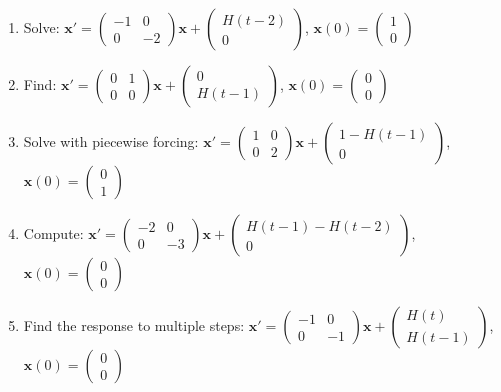 \documentclass[12pt]{article}
\begin{document}
\begin{enumerate}[start=6]
\item Solve: $\mathbf{x}' = \begin{pmatrix} -1 & 0 \\ 0 & -2 \end{pmatrix}\mathbf{x} + \begin{pmatrix} H(t-2) \\ 0 \end{pmatrix}$, $\mathbf{x}(0) = \begin{pmatrix} 1 \\ 0 \end{pmatrix}$

\item Find: $\mathbf{x}' = \begin{pmatrix} 0 & 1 \\ 0 & 0 \end{pmatrix}\mathbf{x} + \begin{pmatrix} 0 \\ H(t-1) \end{pmatrix}$, $\mathbf{x}(0) = \begin{pmatrix} 0 \\ 0 \end{pmatrix}$

\item Solve with piecewise forcing: $\mathbf{x}' = \begin{pmatrix} 1 & 0 \\ 0 & 2 \end{pmatrix}\mathbf{x} + \begin{pmatrix} 1-H(t-1) \\ 0 \end{pmatrix}$, $\mathbf{x}(0) = \begin{pmatrix} 0 \\ 1 \end{pmatrix}$

\item Compute: $\mathbf{x}' = \begin{pmatrix} -2 & 0 \\ 0 & -3 \end{pmatrix}\mathbf{x} + \begin{pmatrix} H(t-1) - H(t-2) \\ 0 \end{pmatrix}$, $\mathbf{x}(0) = \begin{pmatrix} 0 \\ 0 \end{pmatrix}$

\item Find the response to multiple steps: $\mathbf{x}' = \begin{pmatrix} -1 & 0 \\ 0 & -1 \end{pmatrix}\mathbf{x} + \begin{pmatrix} H(t) \\ H(t-1) \end{pmatrix}$, $\mathbf{x}(0) = \begin{pmatrix} 0 \\ 0 \end{pmatrix}$
\end{enumerate}
\end{document}
